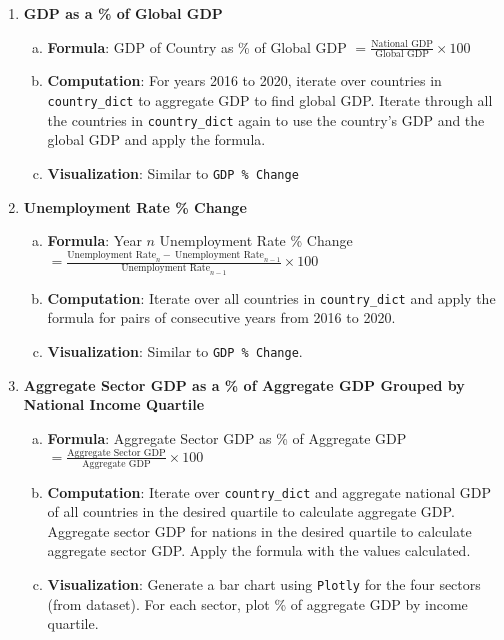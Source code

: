 \documentclass[fontsize=11pt]{article}
\begin{document}
\begin{enumerate}
        \item \textbf{GDP as a \% of Global GDP}
            \begin{enumerate}[(a)]
                \item \textbf{Formula}: GDP of Country as \% of Global GDP $= \frac{\text{National GDP}}{\text{Global GDP}} \times 100$
                \item \textbf{Computation}: For years 2016 to 2020, iterate over countries in \texttt{country\_dict} to aggregate GDP to find global GDP. Iterate through all the countries in \texttt{country\_dict} again to use the country's GDP and the global GDP and apply the formula.
                \item \textbf{Visualization}: Similar to \texttt{GDP \% Change}
            \end{enumerate}
        \item \textbf{Unemployment Rate \% Change}
            \begin{enumerate}[(a)]
                \item \textbf{Formula}: Year $n$ Unemployment Rate \% Change $= \frac{\text{Unemployment \ Rate}_{n}-\  \text{Unemployment \ Rate}_{n-1}}{\text{Unemployment \ Rate}_{n-1}} \times 100$
                \item \textbf{Computation}: Iterate over all countries in \texttt{country\_dict} and apply the formula for pairs of consecutive years from 2016 to 2020.
                \item \textbf{Visualization}: Similar to \texttt{GDP \% Change}.
            \end{enumerate}
        \item \textbf{Aggregate Sector GDP as a \% of Aggregate GDP Grouped by National Income Quartile}
            \begin{enumerate}[(a)]
                \item \textbf{Formula}: Aggregate Sector GDP as \% of Aggregate GDP $= \frac{\text{Aggregate \ Sector \ GDP}}{\text{Aggregate \ GDP}} \times 100$
                \item \textbf{Computation}: Iterate over \texttt{country\_dict} and aggregate national GDP of all countries in the desired quartile to calculate aggregate GDP. Aggregate sector GDP for nations in the desired quartile to calculate aggregate sector GDP. Apply the formula with the values calculated.
                \item \textbf{Visualization}: Generate a bar chart using \texttt{Plotly} for the four sectors (from dataset). For each sector, plot \% of aggregate GDP by income quartile.
            \end{enumerate}


\end{enumerate}
\end{document}
